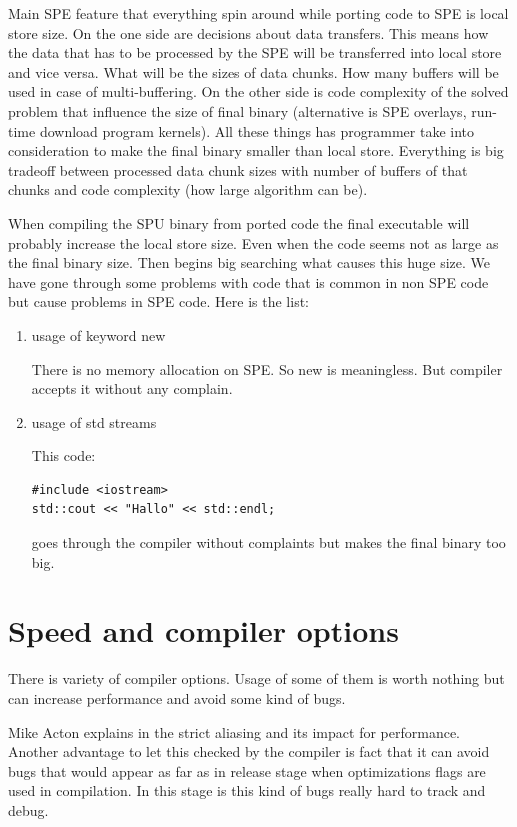 \par
Main SPE feature that everything spin around while porting code to SPE is local store size.
On the one side are decisions about data transfers.
This means how the data that has to be processed by the SPE will be transferred into local store and vice versa.
What will be the sizes of data chunks.
How many buffers will be used in case of multi-buffering.
On the other side is code complexity of the solved problem that influence the size of final binary (alternative is SPE overlays, run-time download program kernels).
All these things has programmer take into consideration to make the final binary smaller than local store.
Everything is big tradeoff between processed data chunk sizes with number of buffers of that chunks and code complexity (how large algorithm can be).
\par
When compiling the SPU binary from ported code the final executable will probably increase the local store size.
Even when the code seems not as large as the final binary size.
Then begins big searching what causes this huge size.
We have gone through some problems with code that is common in non SPE code but cause problems in SPE code.
Here is the list:
\begin{enumerate}
\item usage of keyword new
\par
There is no memory allocation on SPE. So new is meaningless.
But compiler accepts it without any complain.

\item usage of std streams
\par
This code:
\begin{verbatim}
#include <iostream>
std::cout << "Hallo" << std::endl;
\end{verbatim}
goes through the compiler without complaints but makes the final binary too big.

\end{enumerate}

\section {Speed and compiler options}

\par
There is variety of compiler options.
Usage of some of them is worth nothing but can increase performance and avoid some kind of bugs.

\par
Mike Acton explains in \cite{strictAliasing} the strict aliasing and its impact for performance.
Another advantage to let this checked by the compiler is fact that it can avoid bugs that would appear as far as in release stage when optimizations flags are used in compilation.
In this stage is this kind of bugs really hard to track and debug.


